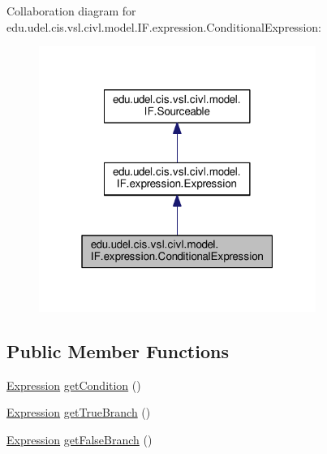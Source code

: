 Collaboration diagram for edu.\+udel.\+cis.\+vsl.\+civl.\+model.\+I\+F.\+expression.\+Conditional\+Expression\+:
\nopagebreak
\begin{figure}[H]
\begin{center}
\leavevmode
\includegraphics[width=256pt]{interfaceedu_1_1udel_1_1cis_1_1vsl_1_1civl_1_1model_1_1IF_1_1expression_1_1ConditionalExpression__coll__graph}
\end{center}
\end{figure}
\subsection*{Public Member Functions}
\begin{DoxyCompactItemize}
\item 
\hyperlink{interfaceedu_1_1udel_1_1cis_1_1vsl_1_1civl_1_1model_1_1IF_1_1expression_1_1Expression}{Expression} \hyperlink{interfaceedu_1_1udel_1_1cis_1_1vsl_1_1civl_1_1model_1_1IF_1_1expression_1_1ConditionalExpression_acb0c12fcf14edd780b1b1312400a076b}{get\+Condition} ()
\item 
\hyperlink{interfaceedu_1_1udel_1_1cis_1_1vsl_1_1civl_1_1model_1_1IF_1_1expression_1_1Expression}{Expression} \hyperlink{interfaceedu_1_1udel_1_1cis_1_1vsl_1_1civl_1_1model_1_1IF_1_1expression_1_1ConditionalExpression_ac0e9ac41a1f894e813e41e017cb48abd}{get\+True\+Branch} ()
\item 
\hyperlink{interfaceedu_1_1udel_1_1cis_1_1vsl_1_1civl_1_1model_1_1IF_1_1expression_1_1Expression}{Expression} \hyperlink{interfaceedu_1_1udel_1_1cis_1_1vsl_1_1civl_1_1model_1_1IF_1_1expression_1_1ConditionalExpression_a3a72f6cd8314befa0aa1e4dc20d10708}{get\+False\+Branch} ()
\end{DoxyCompactItemize}


